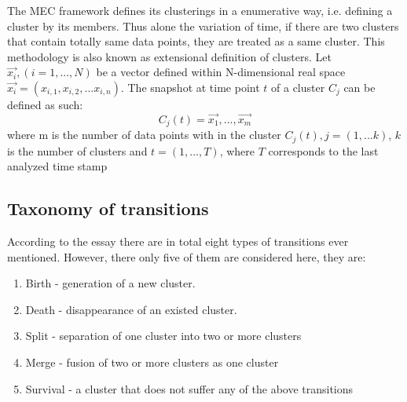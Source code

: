 \documentclass{sig-alternate-05-2015}
\begin{document}
The MEC framework defines its clusterings in a enumerative way, i.e. defining a cluster by its members. Thus alone the variation of time, if there are two clusters that contain totally same data points, they are treated as a same cluster. This methodology is also known as extensional definition of clusters. Let $\vec{x_i},(i=1,...,N)$ be a vector defined within N-dimensional real space $\vec{x_i}=(x_{i,1},x_{i,2},...x_{i,n})$. The snapshot at time point $t$ of a cluster $C_j$ can be defined as such:
    \begin{displaymath}
      C_j(t)={\vec{x_1},...,\vec{x_m}}
    \end{displaymath}
where m is the number of data points with in the cluster $C_j(t),j=(1,...k)$, $k$ is the number of clusters and $t=(1,...,T)$, where $T$ corresponds to the last analyzed time stamp
\subsection{Taxonomy of transitions}
According to the essay there are in total eight types of transitions ever mentioned\cite{SPILIOPOULOU:transition}\cite{FALKOWSKI:socialnet}\cite{YANG:spatiotemporal}\cite{AGGARWAL:diagnosis}\cite{CHEN:change}\cite{AGGARWAL:diagnosis}\cite{LI:entropy}\cite{KAUR:concept}\cite{ASUR:event}. However, there only five of them are considered here, they are:
\begin{enumerate}
  \item Birth       - generation of a new cluster.
  \item Death       - disappearance of an existed cluster.
  \item Split       - separation of one cluster into two or more clusters
  \item Merge       - fusion of two or more clusters as one cluster
  \item Survival    - a cluster that does not suffer any of the above transitions
\end{enumerate}
\end{document}
